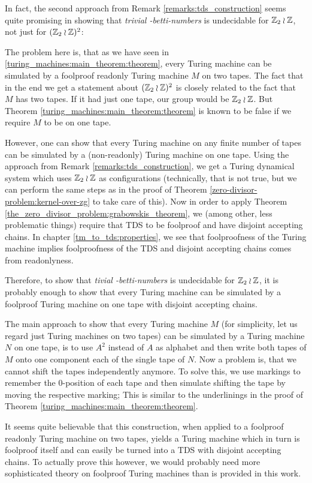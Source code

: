 \begin{Remark}
	In fact, the second approach from Remark \ref{remarks:tds_construction} seems quite promising in showing that \emph{trivial \ltwo-betti-numbers} is undecidable for $\mathbb{Z}_2 \wr \mathbb{Z}$, not just for $(\mathbb{Z}_2 \wr \mathbb{Z})^2$:

	The problem here is, that as we have seen in \ref{turing_machines:main_theorem:theorem}, every Turing machine can be simulated by a foolproof readonly Turing machine $M$ on two tapes.
	The fact that in the end we get a statement about $(\mathbb{Z}_2 \wr \mathbb{Z})^2$ is closely related to the fact that $M$ has two tapes.
	If it had just one tape, our group would be $\mathbb{Z}_2 \wr \mathbb{Z}$.
	But Theorem \ref{turing_machines:main_theorem:theorem} is known to be false if we require $M$ to be on one tape.

	However, one can show that every Turing machine on any finite number of tapes can be simulated by a (non-readonly) Turing machine on one tape.
	Using the approach from Remark \ref{remarks:tds_construction}, we get a Turing dynamical system which uses $\mathbb{Z}_2 \wr \mathbb{Z}$ as configurations (technically, that is not true, but we can perform the same steps as in the proof of Theorem \ref{zero-divisor-problem:kernel-over-zg} to take care of this).
	Now in order to apply Theorem \ref{the_zero_divisor_problem:grabowskis_theorem}, we (among other, less problematic things) require that TDS to be foolproof and have disjoint accepting chains.
	In chapter \ref{tm_to_tds:properties}, we see that foolproofness of the Turing machine implies foolproofness of the TDS and disjoint accepting chains comes from readonlyness.

	Therefore, to show that \emph{tivial \ltwo-betti-numbers} is undecidable for $\mathbb{Z}_2 \wr \mathbb{Z}$, it is probably enough to show that every Turing machine can be simulated by a foolproof Turing machine on one tape with disjoint accepting chains.

	The main approach to show that every Turing machine $M$ (for simplicity, let us regard just Turing machines on two tapes) can be simulated by a Turing machine $N$ on one tape, is to use $A^2$ instead of $A$ as alphabet and then write both tapes of $M$ onto one component each of the single tape of $N$.
	Now a problem is, that we cannot shift the tapes independently anymore.
	To solve this, we use markings to remember the $0$-position of each tape and then simulate shifting the tape by moving the respective marking; This is similar to the underlinings in the proof of Theorem \ref{turing_machines:main_theorem:theorem}.

	It seems quite believable that this construction, when applied to a foolproof readonly Turing machine on two tapes, yields a Turing machine which in turn is foolproof itself and can easily be turned into a TDS with disjoint accepting chains.
	To actually prove this however, we would probably need more sophisticated theory on foolproof Turing machines than is provided in this work.
\end{Remark}

